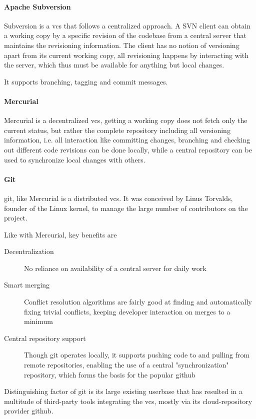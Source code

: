 \paragraph{Apache Subversion}
Subversion is a \gls{vcs} that follows a centralized approach. A SVN client can obtain a working copy by  a specific revision of the codebase from a central server that maintains the revisioning information. The client has no notion of versioning apart from its current working copy, all revisioning happens by interacting with the server, which thus must be available for anything but local changes.

It supports branching, tagging and commit messages.

\paragraph{Mercurial}
Mercurial is a decentralized \gls{vcs}, getting a working copy does not fetch only the current status, but rather the complete repository including all versioning information, i.e. all interaction like committing changes, branching and checking out different code revisions can be done locally, while a central repository can be used to synchronize local changes with others.

\paragraph{Git}
\gls{git}, like Mercurial is a distributed \gls{vcs}. It was conceived by Linus Torvalds, founder of the Linux kernel, to manage the large number of contributors on the project.

Like with Mercurial, key benefits are
\begin{description}
	\item[Decentralization] No reliance on availability of a central server for daily work
	\item[Smart merging] Conflict resolution algorithms are fairly good at finding and automatically fixing trivial conflicts, keeping developer interaction on merges to a minimum
	\item[Central repository support] Though git operates locally, it supports pushing code to and pulling from remote repositories, enabling the use of a central "synchronization" repository, which forms the basis for the popular \gls{github} 
\end{description}
Distinguishing factor of \gls{git} is its large existing userbase that has resulted in a multitude of third-party tools integrating the \gls{vcs}, mostly via its \gls{cloud}-repository provider \gls{github}.

